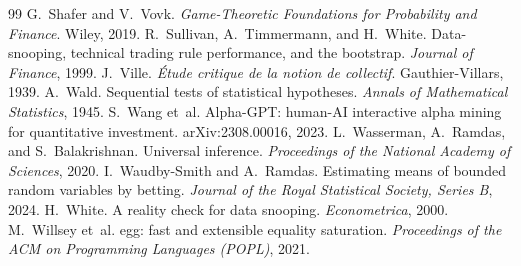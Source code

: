 \documentclass[11pt]{article}
\begin{document}
\begin{thebibliography}{99}
 G.~Shafer and V.~Vovk. \emph{Game-Theoretic Foundations for Probability and Finance}. Wiley, 2019.
 R.~Sullivan, A.~Timmermann, and H.~White. Data-snooping, technical trading rule performance, and the bootstrap. \emph{Journal of Finance}, 1999.
 J.~Ville. \emph{\'Etude critique de la notion de collectif}. Gauthier-Villars, 1939.
 A.~Wald. Sequential tests of statistical hypotheses. \emph{Annals of Mathematical Statistics}, 1945.
 S.~Wang et~al. Alpha-GPT: human-AI interactive alpha mining for quantitative investment. arXiv:2308.00016, 2023.
 L.~Wasserman, A.~Ramdas, and S.~Balakrishnan. Universal inference. \emph{Proceedings of the National Academy of Sciences}, 2020.
 I.~Waudby-Smith and A.~Ramdas. Estimating means of bounded random variables by betting. \emph{Journal of the Royal Statistical Society, Series B}, 2024.
 H.~White. A reality check for data snooping. \emph{Econometrica}, 2000.
 M.~Willsey et~al. egg: fast and extensible equality saturation. \emph{Proceedings of the ACM on Programming Languages (POPL)}, 2021.
\end{thebibliography}
\end{document}

